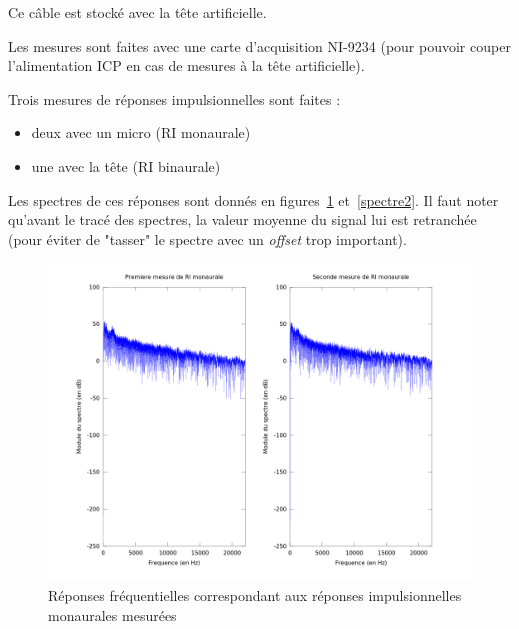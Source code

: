 \documentclass[12pt]{article}
\begin{document}
Ce câble est stocké avec la tête artificielle.

Les mesures sont faites avec une carte d'acquisition NI-9234 (pour pouvoir couper l'alimentation ICP en cas de mesures à
la tête artificielle).

Trois mesures de réponses impulsionnelles sont faites  :

\begin{itemize}
    \item deux avec un micro (RI monaurale)
    \item une avec la tête (RI binaurale)
\end{itemize}

Les spectres de ces réponses sont donnés en figures~\ref{spectre1} et~\ref{spectre2}.
Il faut noter qu'avant le tracé des spectres, la valeur moyenne du signal lui est retranchée (pour éviter de "tasser" le
spectre avec un \textit{offset} trop important).

\begin{figure}[h]
    \vfill\begin{center}
        \includegraphics[scale=0.4]{ris_monaurales.png}
    \end{center}\vfill
    \caption{\label{spectre1} Réponses fréquentielles correspondant aux réponses impulsionnelles monaurales mesurées}
\end{figure}
\end{document}
